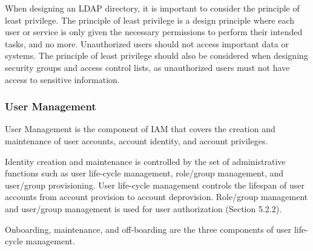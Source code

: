 When designing an LDAP directory, it is important to consider the principle of least privilege. The principle of least privilege is a design principle where each user or service is only given the necessary permissions to perform their intended tasks, and no more. Unauthorized users should not access important data or systems. The principle of least privilege should also be considered when designing security groups and access control lists, as unauthorized users must not have access to sensitive information.

\subsubsection{User Management}

User Management is the component of IAM that covers the creation and maintenance of user accounts, account identity, and account privileges. 

Identity creation and maintenance is controlled by the set of administrative functions such as user life-cycle management, role/group management, and user/group provisioning. User life-cycle management controls the lifespan of user accounts from account provision to account deprovision. Role/group management and user/group management is used for user authorization (Section 5.2.2). 

Onboarding, maintenance, and off-boarding are the three components of user life-cycle management. 

